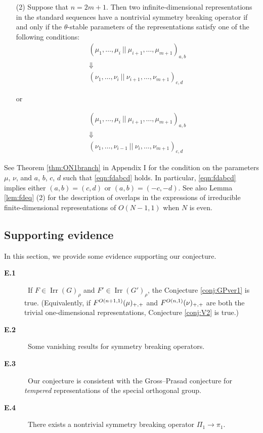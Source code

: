 \begin{conjecture}
\begin{enumerate}
\item[{\rm{(2)}}]  
Suppose that $n=2m+1$.  
Then two infinite-dimensional representations in the standard sequences
 have a nontrivial symmetry breaking operator
 if and only if the $\theta$-stable parameters of the representations satisfy one of the following conditions:
\begin{eqnarray*} 
 & (\mu_{1}, \dots , \mu_i ~|| ~\mu_{i+1} , \dots , \mu_{m+1})_{a,b} &  \\  
 & \Downarrow &    \\
 &  (\nu_1, \dots  ,\nu_i ~ ||~ \nu_{i+1}, \dots ,\nu_{m+1}  )_{c,d} &
 \end{eqnarray*}
 \begin{center}
or 
\end{center}
\begin{eqnarray*}
& (\mu_{1}, \dots , \mu_i ~|| ~\mu_{i+1} , \dots , \mu_{m+1})_{a,b} &\\
& \Downarrow &  \\
 &  (\nu_1,  \dots  ,\nu_{i-1}  ~ ||~ \nu_{i}, \dots ,\nu_{m+1}  )_{c,d} &
 \end{eqnarray*}
\end{enumerate}  
\end{conjecture}

\begin{remark}
\label{rem:V2}
See Theorem \ref{thm:ON1branch} in Appendix I
 for the condition on the parameters $\mu$, $\nu$, and $a$, $b$, $c$, $d$
 such that \eqref{eqn:fdabcd} holds.  
In particular,
 \eqref{eqn:fdabcd} implies either 
 $(a,b)=(c,d)$ or $(a,b)=(-c,-d)$.  
See also Lemma \ref{lem:fdeq} (2) 
 for the description of overlaps in the expressions
 of irreducible finite-dimensional representations
 of $O(N-1,1)$ 
 when $N$ is even.  
\end{remark}
\subsection{Supporting evidence}
\label{subsec:SuppConj}

In this section,
 we provide some evidence 
 supporting our conjecture.  
\begin{description} 
\item[{\bf E.1}] \
If $F \in {\operatorname{Irr}}(G)_{\rho}$
 and $F' \in {\operatorname{Irr}}(G')_{\rho}$, 
 the Conjecture \ref{conj:GPver1} is true.  
(Equivalently,
 if $F^{{O(n+1,1)}}({\mu})_{+,+}$ and $F^{{O(n,1)}}({\nu})_{+,+}$ are both the trivial one-dimensional representations, 
Conjecture \ref{conj:V2} is true.)
\item[{\bf E.2}]  \ Some vanishing results  for symmetry breaking operators.  
\item[{\bf E.3}] \ Our conjecture is consistent
 with the Gross--Prasad conjecture for {\it{tempered}} representations of the special orthogonal group.
\item[{\bf E.4}]
  \  There exists a nontrivial symmetry breaking operator $\Pi_1 \rightarrow \pi_1$.  
\label{subsec:vanishtemp}
\end{description}


